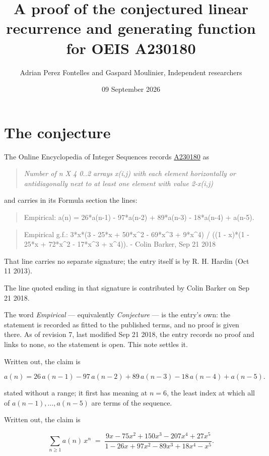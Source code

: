 \documentclass[11pt]{article}
\title{A proof of the conjectured linear recurrence and generating function for OEIS A230180}
\author{Adrian Perez Fontelles and Gaspard Moulinier, Independent researchers}
\date{09 September 2026}
\theoremstyle{definition}
\begin{document}
\maketitle
\section{The conjecture}

The Online Encyclopedia of Integer Sequences records \href{https://oeis.org/A230180}{A230180} as

\begin{quote}\itshape Number of n X 4 0..2 arrays x(i,j) with each element horizontally or antidiagonally next to at least one element with value 2-x(i,j)\end{quote}

and carries in its Formula section the lines:

\begin{quote}\ttfamily Empirical: a(n) = 26*a(n-1) - 97*a(n-2) + 89*a(n-3) - 18*a(n-4) + a(n-5).\end{quote}

\begin{quote}\ttfamily Empirical g.f.: 3*x*(3 - 25*x + 50*x\textasciicircum{}2 - 69*x\textasciicircum{}3 + 9*x\textasciicircum{}4) / ((1 - x)*(1 - 25*x + 72*x\textasciicircum{}2 - 17*x\textasciicircum{}3 + x\textasciicircum{}4)). - Colin Barker, Sep 21 2018\end{quote}

That line carries no separate signature; the entry itself is by R. H. Hardin (Oct 11 2013).

The line quoted ending in that signature is contributed by Colin Barker on Sep 21 2018.

The word {\itshape Empirical} --- equivalently {\itshape Conjecture} --- is the entry's own: the statement is recorded as fitted to the published terms, and no proof is given there. As of revision 7, last modified Sep 21 2018, the entry records no proof and links to none, so the statement is open. This note settles it.

Written out, the claim is

\[a(n) = 26\,a(n-1) - 97\,a(n-2) + 89\,a(n-3) - 18\,a(n-4) + a(n-5).\]

stated without a range; it first has meaning at $n = 6$, the least index at which all of $a(n-1),\dots,a(n-5)$ are terms of the sequence.

Written out, the claim is

\[\sum_{n \ge 1} a(n)\,x^n \;=\; \frac{9x - 75x^{2} + 150x^{3} - 207x^{4} + 27x^{5}}{1 - 26x + 97x^{2} - 89x^{3} + 18x^{4} - x^{5}}.\]
\end{document}
